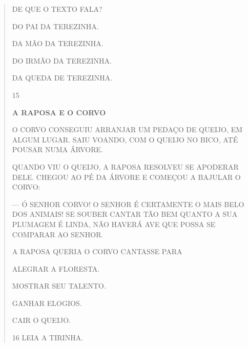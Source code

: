 \begin{escola}
{\begin{verse}

DE QUE O TEXTO FALA?

\begin{escolha}
\item DO PAI DA TEREZINHA.

\item DA MÃO DA TEREZINHA.

\item DO IRMÃO DA TEREZINHA.

\item DA QUEDA DE TEREZINHA.
\end{escolha}


\num{15}

\textbf{A RAPOSA E O CORVO}

O CORVO CONSEGUIU ARRANJAR UM PEDAÇO DE QUEIJO, EM ALGUM
LUGAR. SAIU VOANDO, COM O QUEIJO NO BICO, ATÉ POUSAR NUMA
ÁRVORE.

QUANDO VIU O QUEIJO, A RAPOSA RESOLVEU SE APODERAR
DELE. CHEGOU AO PÉ DA ÁRVORE E COMEÇOU A BAJULAR O CORVO:

--- Ó SENHOR CORVO! O SENHOR É CERTAMENTE O MAIS BELO
DOS ANIMAIS! SE SOUBER CANTAR TÃO BEM QUANTO A SUA PLUMAGEM
É LINDA, NÃO HAVERÁ AVE QUE POSSA SE COMPARAR AO SENHOR.


A RAPOSA QUERIA O CORVO CANTASSE PARA

\begin{escolha}
\item ALEGRAR A FLORESTA.

\item MOSTRAR SEU TALENTO.

\item GANHAR ELOGIOS.

\item CAIR O QUEIJO.
\end{escolha}



\num{16} LEIA A TIRINHA.




\end{verse}}
\end{escola}
